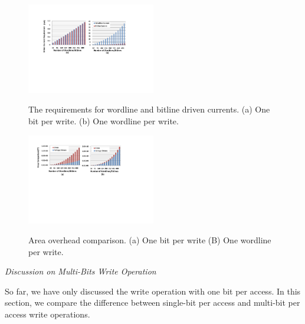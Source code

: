 \begin{figure}%
\centering
  \includegraphics[width=0.5\textwidth]{./figures/drive_i_f.pdf}\\
  \caption{The requirements for wordline and bitline driven currents. (a) One bit per write. (b) One wordline per write.}\label{fig:drive_i}
\end{figure}



\begin{figure}%
\centering
  \includegraphics[width=0.5\textwidth]{./figures/area_comp_f.pdf}\\
  \caption{Area overhead comparison. (a) One bit per write (B) One wordline per write.}\label{fig:area_i}
\vspace{-10pt}
\end{figure}

\vspace{6pt} \emph{Discussion on Multi-Bits Write Operation} \vspace{2pt}

So far, we have only discussed the write operation with one bit per
access. In this section, we compare the difference between single-bit per
access and multi-bit per access write operations.

